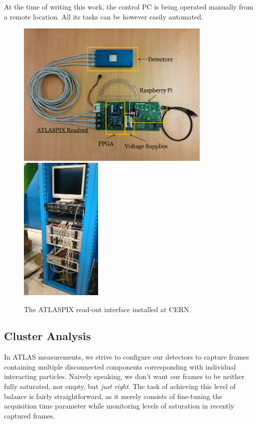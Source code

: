 At the time of writing this work, the control PC is being operated manually from a remote location. All its tasks can be however easily automated.

\begin{figure}[t]
\begin{center}
\includegraphics[height=7cm]{figures/imported/atlaspix}
\includegraphics[height=7cm]{figures/imported/atlaspix-installed}
\caption{The ATLASPIX read-out interface installed at CERN.}
\label{fig:ATLASPIX}
\end{center}
\end{figure}


\subsection{Cluster Analysis}
In ATLAS measurements, we strive to configure our detectors to capture frames containing multiple disconnected components corresponding with individual interacting particles. Naively speaking, we don't want our frames to be neither fully saturated, nor empty, but \textit{just right}. The task of achieving this level of balance is fairly straightforward, as it merely consists of fine-tuning the acquisition time parameter while monitoring levels of saturation in recently captured frames.

